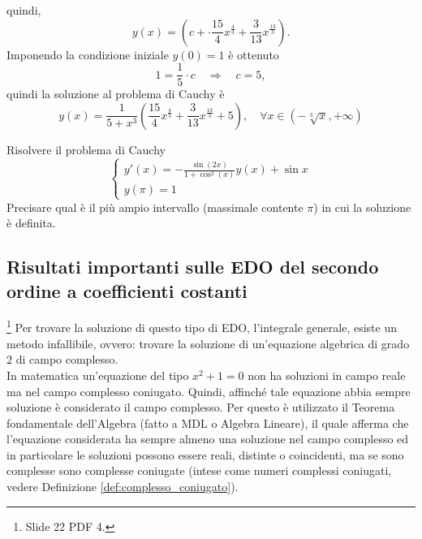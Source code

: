\begin{example}
    \noindent quindi,
    \begin{equation*}
        y(x)= \left(c+\cdot\frac{15}{4}x^{\frac{4}{3}} + \frac{3}{13}x^{\frac{13}{3}}\right).
    \end{equation*}
    Imponendo la condizione iniziale $y(0) = 1$ è ottenuto
    \begin{equation*}
        1=\frac{1}{5}\cdot c \quad\Rightarrow\quad c=5,
    \end{equation*}
    quindi la soluzione al problema di Cauchy è
    \begin{equation*}
        y(x) = \frac{1}{5+x^3} \left(\frac{15}{4}x^{\frac{4}{3}} + \frac{3}{13}x^{\frac{13}{3}}+5\right),\quad \forall x\in(-\sqrt[3]{x}, +\infty)
    \end{equation*}
\end{example}

\begin{exercise}
    Risolvere il problema di Cauchy
    \begin{equation*}
        \begin{cases}
            y'(x) = -\frac{\sin(2x)}{1+\cos^2(x)}y(x) + \sin x\\
            y(\pi)= 1
        \end{cases}
    \end{equation*}
    Precisare qual è il più ampio intervallo (massimale contente $\pi$) in cui la soluzione è definita.
\end{exercise}

\subsection{Risultati importanti sulle EDO del secondo ordine a coefficienti costanti}\footnote{Slide 22 PDF 4.} 
Per trovare la soluzione di questo tipo di EDO, l'integrale generale, esiste un metodo infallibile, ovvero: trovare la soluzione di un'equazione algebrica di grado 2 di campo complesso.\\
In matematica un'equazione del tipo $x^2+1=0$ non ha soluzioni in campo reale ma nel campo complesso coniugato. Quindi, affinché tale equazione abbia sempre soluzione è considerato il campo complesso. Per questo è utilizzato il Teorema fondamentale dell'Algebra (fatto a MDL o Algebra Lineare), il quale afferma che l'equazione considerata ha sempre almeno una soluzione nel campo complesso ed in particolare le soluzioni possono essere reali, distinte o coincidenti, ma se sono complesse sono complesse coniugate (intese come numeri complessi coniugati, vedere Definizione \ref{def:complesso_coniugato}).

